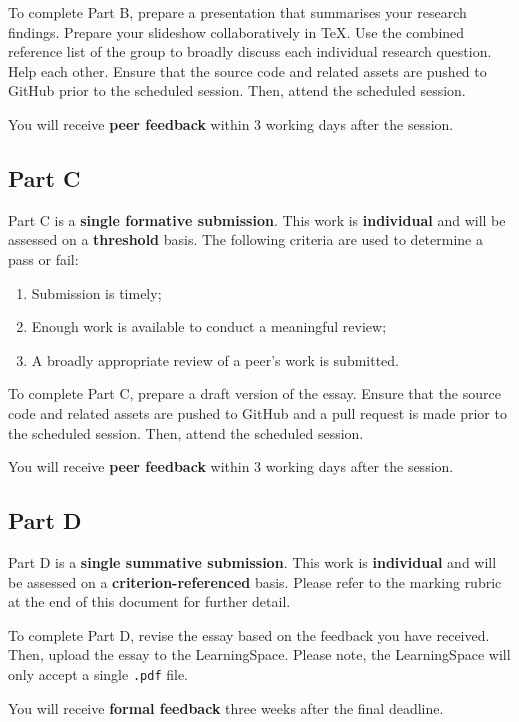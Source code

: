 \documentclass{../fal_assignment}
\begin{document}
To complete Part B, prepare a presentation that summarises your research findings. Prepare your slideshow collaboratively in TeX. Use the combined reference list of the group to broadly discuss each individual research question. Help each other. Ensure that the source code and related assets are pushed to GitHub prior to the scheduled session. Then, attend the scheduled session.

You will receive \textbf{peer feedback} within 3 working days after the session.

\subsection*{Part C}

Part C is a \textbf{single formative submission}. This work is \textbf{individual} and will be assessed on a \textbf{threshold} basis. The following criteria are used to determine a pass or fail:

\begin{enumerate}[label=(\alph*)]
	\item Submission is timely;
	\item Enough work is available to conduct a meaningful review;
	\item A broadly appropriate review of a peer's work is submitted.
\end{enumerate}

To complete Part C, prepare a draft version of the essay. Ensure that the source code and related assets are pushed to GitHub and a pull request is made prior to the scheduled session. Then, attend the scheduled session.

You will receive \textbf{peer feedback} within 3 working days after the session.

\subsection*{Part D}

Part D is a \textbf{single summative submission}. This work is \textbf{individual} and will be assessed on a \textbf{criterion-referenced} basis. Please refer to the marking rubric at the end of this document for further detail.

To complete Part D, revise the essay based on the feedback you have received. Then, upload the essay to the LearningSpace. Please note, the LearningSpace will only accept a single \texttt{.pdf} file.

You will receive \textbf{formal feedback} three weeks after the final deadline.
\end{document}

